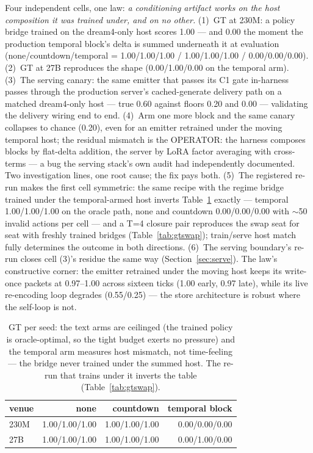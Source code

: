 \documentclass[11pt]{article}
\begin{document}
Four independent cells, one law: \emph{a conditioning artifact works
on the host composition it was trained under, and on no other.}
(1)~GT at 230M: a policy bridge trained on the dream4-only host scores
1.00 --- and 0.00 the moment the production temporal block's delta is
summed underneath it at evaluation
(none/countdown/temporal = 1.00/1.00/1.00 /
1.00/1.00/1.00 /
0.00/0.00/0.00).
(2)~GT at 27B reproduces the shape
(0.00/1.00/0.00 on the temporal arm).
(3)~The serving canary: the same emitter that passes its C1 gate
in-harness passes through the production server's cached-generate
delivery path on a matched dream4-only host --- true
0.60 against floors 0.20 and
0.00 --- validating the delivery wiring end to
end. (4)~Arm one more block and the same canary collapses to chance
(0.20), even for an emitter retrained under the
moving temporal host; the residual mismatch is the OPERATOR: the
harness composes blocks by flat-delta addition, the server by LoRA
factor averaging with cross-terms --- a bug the serving stack's own
audit had independently documented. Two investigation lines, one root
cause; the fix pays both. (5)~The registered re-run makes the first
cell symmetric: the same recipe with the regime bridge trained under
the temporal-armed host inverts Table~\ref{tab:gt} exactly ---
temporal 1.00/1.00/1.00 on the oracle path, none and countdown
0.00/0.00/0.00 with $\sim$50 invalid actions per cell --- and a T=4
closure pair reproduces the swap seat for seat with freshly trained
bridges (Table~\ref{tab:gtswap}); train/serve host match fully
determines the outcome in both directions. (6)~The serving boundary's
re-run closes cell (3)'s residue the same way
(Section~\ref{sec:serve}). The law's constructive corner: the emitter
retrained under the moving host keeps its write-once packets at
0.97--1.00 across sixteen ticks (1.00 early,
0.97 late), while its live re-encoding loop
degrades (0.55/0.25) ---
the store architecture is robust where the self-loop is not.

\begin{table}[t]
\centering
\small
\begin{tabular}{lrrr}
\toprule
venue & none & countdown & temporal block \\
\midrule
230M & 1.00/1.00/1.00 & 1.00/1.00/1.00 & 0.00/0.00/0.00 \\
27B & 1.00/1.00/1.00 & 1.00/1.00/1.00 & 0.00/1.00/0.00 \\
\bottomrule
\end{tabular}
\caption{GT per seed: the text arms are ceilinged (the trained policy
is oracle-optimal, so the tight budget exerts no pressure) and the
temporal arm measures host mismatch, not time-feeling --- the bridge
never trained under the summed host. The re-run that trains under it
inverts the table (Table~\ref{tab:gtswap}).}
\label{tab:gt}
\end{table}
\end{document}
